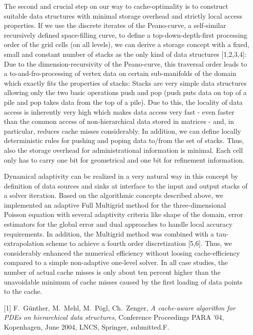 \documentclass[twosided]{report}
\begin{document}
The second and crucial step on our way to cache-optimality is to
construct suitable data structures with minimal storage overhead and
strictly local access properties. If we use the discrete iterates of
the Peano-curve, a self-similar recursively defined space-filling
curve, to define a top-down-depth-first processing order of the grid
cells (on all levels), we can derive a storage concept with a fixed,
small and constant number of stacks as the only kind of data structures
[1,2,3,4]: Due to the dimension-recursivity of the Peano-curve, this
traversal order leads to a to-and-fro-processing of vertex data on
certain sub-manifolds of the domain which exactly fits the properties
of stacks: Stacks are very simple data structures allowing only the two
basic operations push and pop (push puts data on top of a pile and pop
takes data from the top of a pile). Due to this, the locality of data
access is inherently very high which makes data access very fast - even
faster than the common access of non-hierarchical data stored in
matrices - and, in particular, reduces cache misses considerably. In
addition, we can define locally deterministic rules for pushing and
poping data to/from the set of stacks. Thus, also the storage overhead
for administrational information is minimal. Each cell only has to
carry one bit for geometrical and one bit for refinement information.

Dynamical adaptivity can be realized in a very natural way in this
concept by definition of data sources and sinks at interface to the
input and output stacks of a solver iteration. Based on the algorithmic
concepts described above, we implemented an adaptive Full Multigrid
method for the three-dimensional Poisson equation with several
adaptivity criteria like shape of the domain, error estimators for the
global error and dual approaches to handle local accuracy requirements.
In addition, the Multigrid method was combined with a tau-extrapolation
scheme to achieve a fourth order discretization [5,6]. Thus, we
considerably enhanced the numerical efficiency without loosing
cache-efficiency compared to a simple non-adaptive one-level solver. In
all case studies, the number of actual cache misses is only about ten
percent higher than the unavoidable minimum of cache misses caused by
the first loading of data points to the cache.

[1] F.~G\"{u}nther, M.~Mehl, M.~P\"{o}gl, Ch.~Zenger,
{\em A cache-aware
algorithm for PDEs on hierarchical data structures},
Conference Proceedings PARA '04, Kopenhagen, June 2004,
LNCS, Springer, submitted.F.
\end{document}
